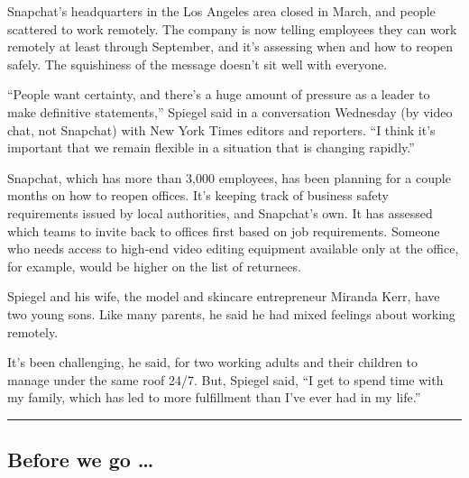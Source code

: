 Snapchat's headquarters in the Los Angeles area closed in March, and
people scattered to work remotely. The company is now telling employees
they can work remotely at least through September, and it's assessing
when and how to reopen safely. The squishiness of the message doesn't
sit well with everyone.

``People want certainty, and there's a huge amount of pressure as a
leader to make definitive statements,'' Spiegel said in a conversation
Wednesday (by video chat, not Snapchat) with New York Times editors and
reporters. ``I think it's important that we remain flexible in a
situation that is changing rapidly.''

Snapchat, which has more than 3,000 employees, has been planning for a
couple months on how to reopen offices. It's keeping track of business
safety requirements issued by local authorities, and Snapchat's own. It
has assessed which teams to invite back to offices first based on job
requirements. Someone who needs access to high-end video editing
equipment available only at the office, for example, would be higher on
the list of returnees.

Spiegel and his wife, the model and skincare entrepreneur Miranda Kerr,
have two young sons. Like many parents, he said he had mixed feelings
about working remotely.

It's been challenging, he said, for two working adults and their
children to manage under the same roof 24/7. But, Spiegel said, ``I get
to spend time with my family, which has led to more fulfillment than
I've ever had in my life.''

\begin{center}\rule{0.5\linewidth}{\linethickness}\end{center}

\hypertarget{before-we-go-}{%
\subsection{Before we go \ldots{}}\label{before-we-go-}}

